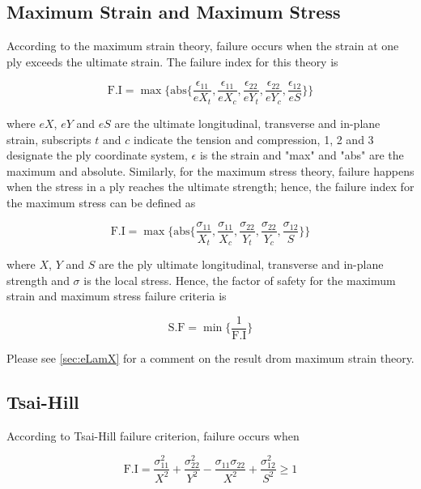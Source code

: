 \documentclass{article}
\begin{document}
\subsection{Maximum Strain and Maximum Stress}
According to the maximum strain theory, failure occurs when the strain at one ply exceeds the ultimate strain. The failure index for this theory is 

\begin{equation}
    \text{F.I} = \max\{\text{abs}\{\dfrac{\epsilon_{11}}{eX_t}, \dfrac{\epsilon_{11}}{eX_c}, \dfrac{\epsilon_{22}}{eY_t}, \dfrac{\epsilon_{22}}{eY_c}, \dfrac{\epsilon_{12}}{eS}\}\}
    \label{eq:max_strain_fi}
\end{equation}

where $eX$, $eY$ and $eS$ are the ultimate longitudinal, transverse and in-plane strain, subscripts $t$ and $c$ indicate the tension and compression, 1, 2 and 3 designate the ply coordinate system, $\epsilon$ is the strain and "max" and "abs" are the maximum and absolute. Similarly, for the maximum stress theory, failure happens when the stress in a ply reaches the ultimate strength; hence, the failure index for the maximum stress can be defined as 

\begin{equation}
    \text{F.I} = \max\{\text{abs}\{\dfrac{\sigma_{11}}{X_t}, \dfrac{\sigma_{11}}{X_c}, \dfrac{\sigma_{22}}{Y_t}, \dfrac{\sigma_{22}}{Y_c}, \dfrac{\sigma_{12}}{S}\}\}
    \label{eq:max_stress_fi}
\end{equation}

where $X$, $Y$ and $S$ are the ply ultimate longitudinal, transverse and in-plane strength and $\sigma$ is the local stress. Hence, the factor of safety for the maximum strain and maximum stress failure criteria is \cite{helius}

\begin{equation}
    \text{S.F} = \min\{\dfrac{1}{\text{F.I}}\}
    \label{eq:max_strain_stress_sf}
\end{equation}

Please see \cref{sec:eLamX} for a comment on the result drom maximum strain theory.

\subsection{Tsai-Hill}
According to Tsai-Hill failure criterion, failure occurs when 

\begin{equation}
    \text{F.I} = \dfrac{\sigma_{11}^2}{X^2} + \dfrac{\sigma_{22}^2}{Y^2} - \dfrac{\sigma_{11} \sigma_{22}}{X^2} + \dfrac{\sigma_{12}^2}{S^2} \geq 1
    \label{eq:tsai_hill_fi}
\end{equation}
\end{document}
